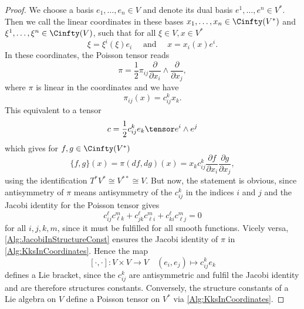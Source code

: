 \begin{proof}
	We choose a basis $e_1, \ldots, e_n \in V$ and denote its dual basis $e^1, 
	\ldots, e^n \in V^*$. Then we call the linear coordinates in these bases 
	$x_1, \ldots, x_n \in \Cinfty(V^*)$ and $\xi^1, \ldots, \xi^n \in 
	\Cinfty(V)$, such that for all $\xi \in V, x \in V^*$
	\begin{equation*}
		\xi
		=
		\xi^i(\xi) e_i
		\quad \text{ and } \quad
		x
		=
		x_i (x) e^i.
	\end{equation*}
	In these coordinates, the Poisson tensor reads
	\begin{equation*}
		\pi
		=
		\frac{1}{2}
		\pi_{ij}
		\frac{\partial}{\partial x_i}
		\wedge
		\frac{\partial}{\partial x_j},
	\end{equation*}
	where $\pi$ is linear in the coordinates and we have
	\begin{equation*}
		\pi_{ij}(x)
		=
		c_{ij}^k x_k.
	\end{equation*}
	This equivalent to a tensor
	\begin{equation*}
		c
		=
		\frac{1}{2}
		c_{ij}^k 
		e_k \tensor e^i \wedge e^j
	\end{equation*}
	which gives for $f,g \in \Cinfty(V^*)$
	\begin{equation}
		\label{Alg:KksInCoordinates}
		\{f, g\} (x)
		=
		\pi(df, dg)(x)
		=
		x_k c_{ij}^k 
		\frac{\partial f}{\partial x_i}
		\frac{\partial g}{\partial x_j},
	\end{equation}
	using the identification $T^*V^* \cong V^{**} \cong V$.
	But now, the statement is obvious, since antisymmetry of $\pi$ means
	antisymmetry of the $c_{ij}^k$ in the indices $i$ and $j$ and the Jacobi
	identity for the Poisson tensor gives
	\begin{equation}
		\label{Alg:JacobiInStructureConst}
		c_{ij}^\ell c_{\ell k}^m
		+
		c_{j k}^\ell c_{\ell i}^m
		+
		c_{ki}^\ell c_{\ell j}^m
		=
		0
	\end{equation}
	for all $i, j, k, m$, since it must be fulfilled for all smooth functions.
	Vicely versa, \eqref{Alg:JacobiInStructureConst} ensures the Jacobi 
	identity of $\pi$ in \eqref{Alg:KksInCoordinates}. Hence the map
	\begin{equation}
		\label{Alg:LieBracketOfKks}
		[ \cdot, \cdot ]
		\colon
		V
		\times
		V
		\longrightarrow
		V
		\quad
		(e_i, e_j)
		\longmapsto
		c_{ij}^k e_k
	\end{equation}
	defines a Lie bracket, since the $c_{ij}^k$ are antisymmetric and fulfil 
	the Jacobi identity and are therefore structures constants. Conversely, 
	the structure constants of a Lie algebra on $V$ define a Poisson tensor on 
	$V^*$ via \eqref{Alg:KksInCoordinates}.
\end{proof}


